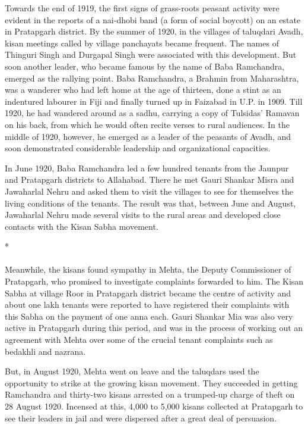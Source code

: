 \begin{multicols}{2}
Towards the end of 1919, the first signs of grass-roots peasant activity were evident in the reports of a nai-dhobi band (a form of social boycott) on an estate in Pratapgarh district. By the summer of 1920, in the villages of taluqdari Avadh, kisan meetings called by village panchayats became frequent. The names of Thinguri Singh and Durgapal Singh were associated with this development. But soon another leader, who became famous by the name of Baba Ramchandra, emerged as the rallying point. Baba Ramchandra, a Brahmin from Maharashtra, was a wanderer who had left home at the age of thirteen, done a stint as an indentured labourer in Fiji and finally turned up in Faizabad in U.P. in 1909. Till 1920, he had wandered around as a sadhu, carrying a copy of Tulsidas' Ramavan on his back, from which he would often recite verses to rural audiences. In the middle of 1920, however, he emerged as a leader of the peasants of Avadh, and soon demonstrated considerable leadership and organizational capacities.

In June 1920, Baba Ramchandra led a few hundred tenants from the Jaunpur and Pratapgarh districts to Allahabad. There he met Gauri Shankar Misra and Jawaharlal Nehru and asked them to visit the villages to see for themselves the living conditions of the tenants. The result was that, between June and August, Jawaharlal Nehru made several visits to the rural areas and developed close contacts with the Kisan Sabha movement.

\begin{center}*\end{center}

\paragraph*{}

Meanwhile, the kisans found sympathy in Mehta, the Deputy Commissioner of Pratapgarh, who promised to investigate complaints forwarded to him. The Kisan Sabha at village Roor in Pratapgarh district became the centre of activity and about one lakh tenants were reported to have registered their complaints with this Sabha on the payment of one anna each. Gauri Shankar Mia was also very active in Pratapgarh during this period, and was in the process of working out an agreement with Mehta over some of the crucial tenant complaints such as bedakhli and nazrana.

But, in August 1920, Mehta went on leave and the taluqdars used the opportunity to strike at the growing kisan movement. They succeeded in getting Ramchandra and thirty-two kisans arrested on a trumped-up charge of theft on 28 August 1920. Incensed at this, 4,000 to 5,000 kisans collected at Pratapgarh to see their leaders in jail and were dispersed after a great deal of persuasion.


\end{multicols}
